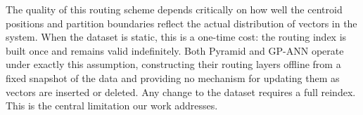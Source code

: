 \documentclass[sigconf,review,anonymous]{acmart}
\begin{document}


    

    The quality of this routing scheme depends critically on how well the centroid positions and partition boundaries reflect the actual distribution of vectors in the system. When the dataset is static, this is a one-time cost: the routing index is built once and remains valid indefinitely. Both Pyramid and GP-ANN operate under exactly this assumption, constructing their routing layers offline from a fixed snapshot of the data and providing no mechanism for updating them as vectors are inserted or deleted. Any change to the dataset requires a full reindex. This is the central limitation our work addresses.
\end{document}
